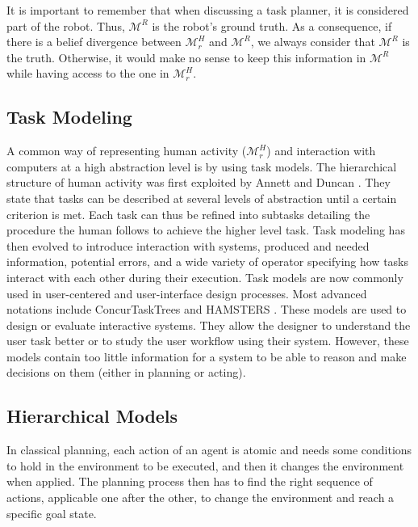 It is important to remember that when discussing a task planner, it is considered part of the robot. Thus, $\mathcal{M}^R$ is the robot's ground truth. As a consequence, if there is a belief divergence between $\mathcal{M}^H_r$ and $\mathcal{M}^R$, we always consider that $\mathcal{M}^R$ is the truth. Otherwise, it would make no sense to keep this information in $\mathcal{M}^R$ while having access to the one in $\mathcal{M}^H_r$.

\subsection{Task Modeling}

A common way of representing human activity ($\mathcal{M}^H_r$) and interaction with computers at a high abstraction level is by using task models. The hierarchical structure of human activity was first exploited by Annett and Duncan \cite{annett1967task}. They state that tasks can be described at several levels of abstraction until a certain criterion is met. Each task can thus be refined into subtasks detailing the procedure the human follows to achieve the higher level task. Task modeling has then evolved to introduce interaction with systems, produced and needed information, potential errors, and a wide variety of operator specifying how tasks interact with each other during their execution. Task models are now commonly used in user-centered and user-interface design processes. Most advanced notations include ConcurTaskTrees \cite{paterno2004concurtasktrees} and HAMSTERS \cite{martinie2019analysing}. These models are used to design or evaluate interactive systems. They allow the designer to understand the user task better or to study the user workflow using their system. However, these models contain too little information for a system to be able to reason and make decisions on them (either in planning or acting).


\subsection{Hierarchical Models}

In classical planning, each action of an agent is atomic and needs some conditions to hold in the environment to be executed, and then it changes the environment when applied. The planning process then has to find the right sequence of actions, applicable one after the other, to change the environment and reach a specific goal state. 

